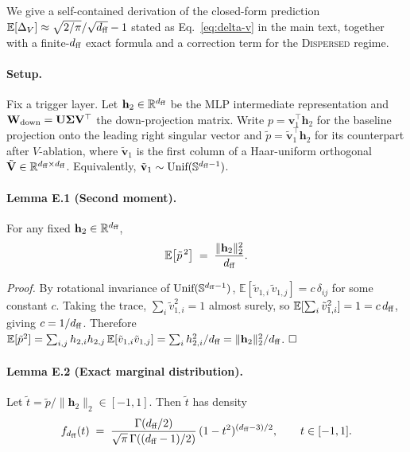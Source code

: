 We give a self-contained derivation of the closed-form prediction
$\mathbb{E}[\Delta_V] \approx \sqrt{2/\pi}/\sqrt{d_{\text{ff}}} - 1$ stated as
Eq.~\eqref{eq:delta-v} in the main text, together with a finite-$d_{\text{ff}}$
exact formula and a correction term for the \textsc{Dispersed} regime.

\paragraph{Setup.}
Fix a trigger layer. Let $\mathbf{h}_2 \in \mathbb{R}^{d_{\text{ff}}}$ be the MLP
intermediate representation and $\mathbf{W}_{\text{down}} = \mathbf{U}\boldsymbol{\Sigma}\mathbf{V}^{\top}$
the down-projection matrix. Write $p = \mathbf{v}_1^{\top} \mathbf{h}_2$
for the baseline projection onto the leading right singular vector and
$\tilde{p} = \tilde{\mathbf{v}}_1^{\top} \mathbf{h}_2$ for its counterpart
after $V$-ablation, where
$\tilde{\mathbf{v}}_1$ is the first column of a Haar-uniform orthogonal
$\tilde{\mathbf{V}} \in \mathbb{R}^{d_{\text{ff}} \times d_{\text{ff}}}$. Equivalently,
$\tilde{\mathbf{v}}_1 \sim \text{Unif}(\mathbb{S}^{d_{\text{ff}}-1})$.

\paragraph{Lemma E.1 (Second moment).}
For any fixed $\mathbf{h}_2 \in \mathbb{R}^{d_{\text{ff}}}$,
\begin{equation}
  \label{eq:lemma-e1}
  \mathbb{E}\!\left[\tilde{p}^{\,2}\right] \;=\; \frac{\|\mathbf{h}_2\|_2^2}{d_{\text{ff}}}.
\end{equation}

\emph{Proof.} By rotational invariance of $\text{Unif}(\mathbb{S}^{d_{\text{ff}}-1})$,
$\mathbb{E}[\tilde{v}_{1,i}\,\tilde{v}_{1,j}] = c\,\delta_{ij}$ for some
constant $c$. Taking the trace, $\sum_{i} \tilde{v}_{1,i}^2 = 1$ almost
surely, so $\mathbb{E}[\sum_i \tilde{v}_{1,i}^2] = 1 = c\,d_{\text{ff}}$, giving
$c = 1/d_{\text{ff}}$. Therefore
$\mathbb{E}[\tilde{p}^2] = \sum_{i,j} h_{2,i} h_{2,j}\,\mathbb{E}[\tilde{v}_{1,i}\tilde{v}_{1,j}] = \sum_{i} h_{2,i}^2 / d_{\text{ff}} = \|\mathbf{h}_2\|_2^2 / d_{\text{ff}}$. $\hfill\square$

\paragraph{Lemma E.2 (Exact marginal distribution).}
Let $\tilde{t} = \tilde{p} / \|\mathbf{h}_2\|_2 \in [-1, 1]$. Then $\tilde{t}$
has density
\begin{equation}
  \label{eq:lemma-e2}
  f_{d_{\text{ff}}}(t) \;=\; \frac{\Gamma(d_{\text{ff}}/2)}{\sqrt{\pi}\,\Gamma((d_{\text{ff}}-1)/2)}\,(1 - t^2)^{(d_{\text{ff}}-3)/2}, \qquad t \in [-1, 1].
\end{equation}


